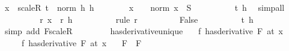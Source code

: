 \begin{isabellebody}
\ {\isacharquery}{\kern0pt}x\ {\isacharequal}{\kern0pt}\ {\isachardoublequoteopen}scaleR\ {\isacharparenleft}{\kern0pt}t\ {\isacharslash}{\kern0pt}\ norm\ h{\isacharparenright}{\kern0pt}\ h{\isachardoublequoteclose}\isanewline
\ \ \ \ \ \ \isamarkupfalse%
\ {\isachardoublequoteopen}{\isacharquery}{\kern0pt}x\ {\isasymnoteq}\ {}{\isachardoublequoteclose}\ \ {\isachardoublequoteopen}norm\ {\isacharquery}{\kern0pt}x\ {\isacharless}{\kern0pt}\ S{\isachardoublequoteclose}\isanewline
\ \ \ \ \ \ \ \ \isamarkupfalse%
\ t\ h\ \isamarkupfalse%
\ simp{\isacharunderscore}{\kern0pt}all\isanewline
\ \ \ \ \ \ \isamarkupfalse%
\ \isamarkupfalse%
\ {\isachardoublequoteopen}{\isacharquery}{\kern0pt}r\ {\isacharquery}{\kern0pt}x\ {\isacharless}{\kern0pt}\ {\isacharquery}{\kern0pt}r\ h{\isachardoublequoteclose}\isanewline
\ \ \ \ \ \ \ \ \isamarkupfalse%
\ {\isacharparenleft}{\kern0pt}rule\ r{\isacharparenright}{\kern0pt}\isanewline
\ \ \ \ \ \ \isamarkupfalse%
\ \isamarkupfalse%
\ False\isanewline
\ \ \ \ \ \ \ \ \isamarkupfalse%
\ t\ h\ \isamarkupfalse%
\ {\isacharparenleft}{\kern0pt}simp\ add{\isacharcolon}{\kern0pt}\ F{\isachardot}{\kern0pt}scaleR{\isacharparenright}{\kern0pt}\isanewline
\ \ \ \ \isamarkupfalse%
\isanewline
\ \ \isamarkupfalse%
\isanewline
{}\isamarkupfalse%
%
\endisatagproof
{\isafoldproof}%
%
\isadelimproof
\isanewline
%
\endisadelimproof
\isanewline
{}\isamarkupfalse%
\ has{\isacharunderscore}{\kern0pt}derivative{\isacharunderscore}{\kern0pt}unique{\isacharcolon}{\kern0pt}\isanewline
\ \ \ {\isachardoublequoteopen}{\isacharparenleft}{\kern0pt}f\ has{\isacharunderscore}{\kern0pt}derivative\ F{\isacharparenright}{\kern0pt}\ {\isacharparenleft}{\kern0pt}at\ x{\isacharparenright}{\kern0pt}{\isachardoublequoteclose}\isanewline
\ \ \ \ \ {\isachardoublequoteopen}{\isacharparenleft}{\kern0pt}f\ has{\isacharunderscore}{\kern0pt}derivative\ F{\isacharprime}{\kern0pt}{\isacharparenright}{\kern0pt}\ {\isacharparenleft}{\kern0pt}at\ x{\isacharparenright}{\kern0pt}{\isachardoublequoteclose}\isanewline
\ \ \ {\isachardoublequoteopen}F\ {\isacharequal}{\kern0pt}\ F{\isacharprime}{\kern0pt}{\isachardoublequoteclose}\isanewline
%
\isadelimproof
%
\endisadelimproof
%
\isatagproof
{}\isamarkupfalse%
\ {\isacharminus}{\kern0pt}\isanewline
\ \ \isamarkupfalse%

\end{isabellebody}
